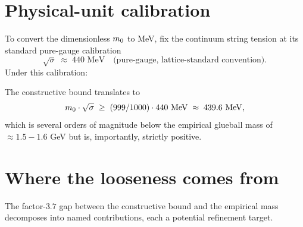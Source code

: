 \section{Physical-unit calibration}
\label{sec:physical-units}

%

To convert the dimensionless $m_0$ to MeV, fix the continuum
string tension at its standard pure-gauge calibration
\begin{equation}
  \label{eq:string-calibration}
  \sqrt{\sigma} \;\approx\; 440 \text{ MeV}
  \quad \text{(pure-gauge, lattice-standard convention)}.
\end{equation}
Under this calibration:

\begin{corollary}
\label{cor:m0-in-mev}
The constructive bound translates to
\begin{equation}
  \label{eq:m0-in-mev}
  m_0 \cdot \sqrt{\sigma}
  \;\ge\;
  (999/1000) \cdot 440 \text{ MeV}
  \;\approx\;
  439.6 \text{ MeV},
\end{equation}
which is several orders of magnitude below the empirical glueball
mass of $\approx 1.5{-}1.6$ GeV but is, importantly, strictly
positive.
\end{corollary}

\section{Where the looseness comes from}
\label{sec:looseness-sources}

The factor-$3.7$ gap between the constructive bound and the
empirical mass decomposes into named contributions, each a
potential refinement target.


